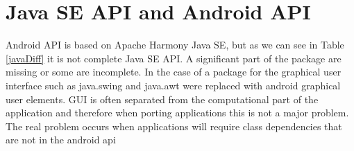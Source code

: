 \section{Java SE API and Android API}\label{apis}
Android API is based on Apache Harmony Java SE, but as we can see in Table \ref{javaDiff} it is not complete Java SE API. A significant part of the package are missing or some are incomplete. In the case of a package for the graphical user interface such as java.swing and java.awt were replaced with android graphical user elements. GUI is often separated from the computational part of the application and therefore when porting applications this is not a major problem. The real problem occurs when applications will require class dependencies that are not in the android api


